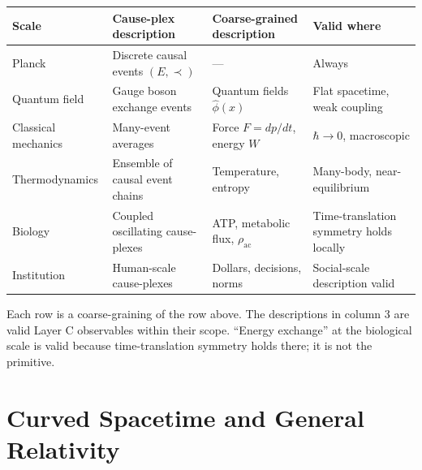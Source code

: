 \documentclass[11pt]{article}
\theoremstyle{definition}
\theoremstyle{remark}
\begin{document}
{\def\LTcaptype{none} %
\begin{longtable}[]{@{}
  >{\raggedright\arraybackslash}p{}
  >{\raggedright\arraybackslash}p{}
  >{\raggedright\arraybackslash}p{}
  >{\raggedright\arraybackslash}p{}@{}}
\toprule\noalign{}
\begin{minipage}[b]{\linewidth}\raggedright
Scale
\end{minipage} & \begin{minipage}[b]{\linewidth}\raggedright
Cause-plex description
\end{minipage} & \begin{minipage}[b]{\linewidth}\raggedright
Coarse-grained description
\end{minipage} & \begin{minipage}[b]{\linewidth}\raggedright
Valid where
\end{minipage} \\
\midrule\noalign{}
\endhead
\bottomrule\noalign{}
\endlastfoot
Planck & Discrete causal events \((E, \prec)\) & --- & Always \\
Quantum field & Gauge boson exchange events & Quantum fields
\(\hat{\phi}(x)\) & Flat spacetime, weak coupling \\
Classical mechanics & Many-event averages & Force \(F = dp/dt\), energy
\(W\) & \(\hbar \to 0\), macroscopic \\
Thermodynamics & Ensemble of causal event chains & Temperature, entropy
& Many-body, near-equilibrium \\
Biology & Coupled oscillating cause-plexes & ATP, metabolic flux,
\(\rho_{\text{ac}}\) & Time-translation symmetry holds locally \\
Institution & Human-scale cause-plexes & Dollars, decisions, norms &
Social-scale description valid \\
\end{longtable}
}

Each row is a coarse-graining of the row above. The descriptions in
column 3 are valid Layer C observables within their scope. ``Energy
exchange'' at the biological scale is valid because time-translation
symmetry holds there; it is not the primitive.

\medskip

\section{Curved Spacetime and General
Relativity}\label{curved-spacetime-and-general-relativity}
\end{document}
